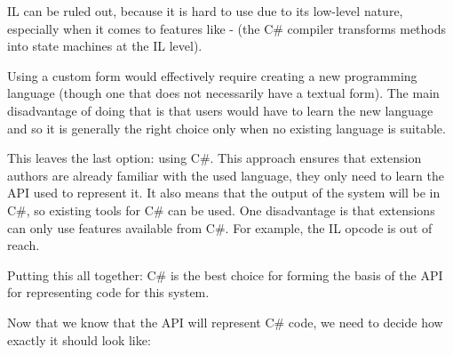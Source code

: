 \ac{IL} can be ruled out, because it is hard to use due to its low-level nature, especially when it comes to features like - (the C\# compiler transforms  methods into state machines at the \ac{IL} level).

Using a custom form would effectively require creating a new programming language (though one that does not necessarily have a textual form). The main disadvantage of doing that is that users would have to learn the new language and so it is generally the right choice only when no existing language is suitable.

This leaves the last option: using C\#. This approach ensures that extension authors are already familiar with the used language, they only need to learn the \ac{API} used to represent it. It also means that the output of the system will be in C\#, so existing tools for C\# can be used. One disadvantage is that extensions can only use features available from C\#. For example, the  \ac{IL} opcode is out of reach.

Putting this all together: C\# is the best choice for forming the basis of the \ac{API} for representing code for this system.

\medskip

Now that we know that the \ac{API} will represent C\# code, we need to decide how exactly it should look like:

